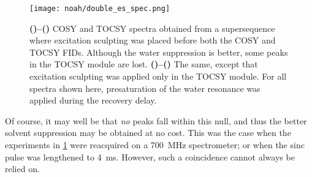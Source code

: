\begin{figure}[!ht]
    \centering
    \texttt{[image: noah/double\_es\_spec.png]}%
    {\label{fig:double_es_spec_2es_c}}%
    {\label{fig:double_es_spec_2es_t}}%
    {\label{fig:double_es_spec_1es_c}}%
    {\label{fig:double_es_spec_1es_t}}%
    \caption[Spectra of CT modules using single and double excitation sculpting]{
        \textbf{()--()} COSY and TOCSY spectra obtained from a  supersequence where excitation sculpting was placed before both the COSY and TOCSY FIDs.
        Although the water suppression is better, some peaks in the TOCSY module are lost.
        \textbf{()--()} The same, except that excitation sculpting was applied only in the TOCSY module.
        For all spectra shown here, presaturation of the water resonance was applied during the recovery delay.
    }
    \label{fig:double_es_spec}
\end{figure}

Of course, it may well be that \textit{no} peaks fall within this null, and thus the better solvent suppression may be obtained at no cost.
This was the case when the experiments in \cref{fig:double_es_spec} were reacquired on a \qty{700}{\MHz} spectrometer; or when the sinc pulse was lengthened to \qty{4}{\ms}.
However, such a coincidence cannot always be relied on.
